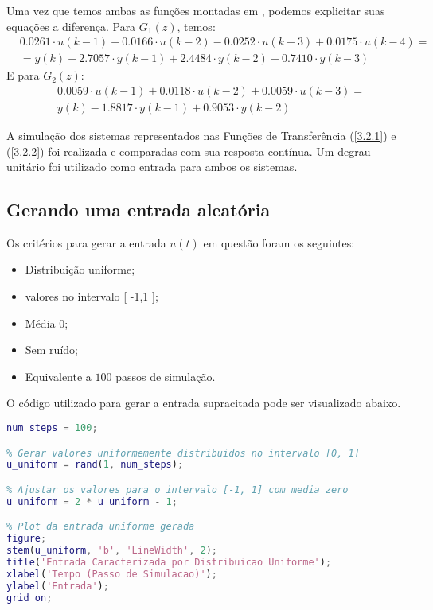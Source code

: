 \documentclass[a4paper,12pt]{article}
\begin{document}
Uma vez que temos ambas as funções montadas em , podemos explicitar suas equações a diferença. Para $G_1(z)$, temos:
\begin{align}\label{3.2.3}
&0.0261 \cdot u(k-1) - 0.0166 \cdot u(k-2) - 0.0252 \cdot u(k-3) + 0.0175 \cdot u(k-4) = \nonumber \\
&= y(k) - 2.7057 \cdot y(k-1) + 2.4484 \cdot y(k-2) - 0.7410 \cdot y(k-3) \tag{3.2.3}
\end{align}
E para $G_2(z)$:
\begin{align}\label{3.2.4}
& 0.0059 \cdot u(k-1) + 0.0118 \cdot u(k-2) + 0.0059 \cdot u(k-3) = \nonumber \\
& y(k)  - 1.8817 \cdot y(k-1) + 0.9053 \cdot y(k-2) \tag{3.2.4}
\end{align}

A simulação dos sistemas representados nas Funções de Transferência (\ref{3.2.1}) e (\ref{3.2.2}) foi realizada e comparadas com sua resposta contínua. Um degrau unitário foi utilizado como entrada para ambos os sistemas.

\subsection{Gerando uma entrada aleatória}\label{3.3}

Os critérios para gerar a entrada $u(t)$ em questão foram os seguintes:
\begin{itemize}
    \item Distribuição uniforme;
    \item valores no intervalo [ -1,1 ];
    \item Média $0$;
    \item Sem ruído;
    \item Equivalente a $100$ passos de simulação.
\end{itemize}

O código utilizado para gerar a entrada supracitada pode ser visualizado abaixo.

\begin{lstlisting}[language=Matlab, caption=Código responsável por gerar a Entrada aleatória]
% Numero de passos de simulacao
num_steps = 100;

% Gerar valores uniformemente distribuidos no intervalo [0, 1]
u_uniform = rand(1, num_steps);

% Ajustar os valores para o intervalo [-1, 1] com media zero
u_uniform = 2 * u_uniform - 1;

% Plot da entrada uniforme gerada
figure;
stem(u_uniform, 'b', 'LineWidth', 2);
title('Entrada Caracterizada por Distribuicao Uniforme');
xlabel('Tempo (Passo de Simulacao)');
ylabel('Entrada');
grid on;
\end{lstlisting}
\end{document}

